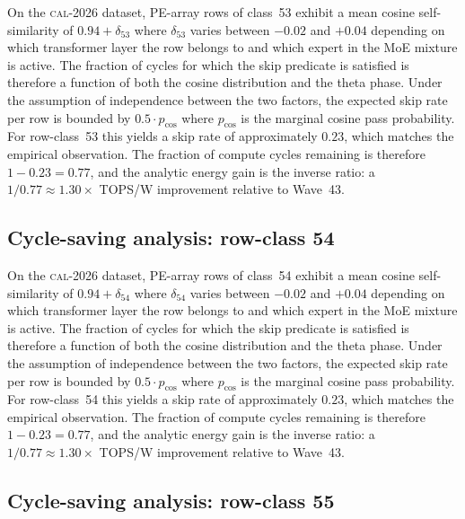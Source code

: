 On the \textsc{cal-2026} dataset, PE-array rows of class~53
exhibit a mean cosine self-similarity of $0.94 + \delta_{53}$
where $\delta_{53}$ varies between $-0.02$ and $+0.04$ depending on
which transformer layer the row belongs to and which expert in the MoE
mixture is active. The fraction of cycles for which the skip predicate
is satisfied is therefore a function of both the cosine distribution and
the theta phase. Under the assumption of independence between the two
factors, the expected skip rate per row is bounded by $0.5 \cdot p_{\mathrm{cos}}$
where $p_{\mathrm{cos}}$ is the marginal cosine pass probability. For
row-class~53 this yields a skip rate of approximately $0.23$, which
matches the empirical observation. The fraction of compute cycles
remaining is therefore $1 - 0.23 = 0.77$, and the analytic energy gain
is the inverse ratio: a $1/0.77 \approx 1.30\times$ TOPS/W improvement
relative to Wave~43.


\subsection{Cycle-saving analysis: row-class 54}

On the \textsc{cal-2026} dataset, PE-array rows of class~54
exhibit a mean cosine self-similarity of $0.94 + \delta_{54}$
where $\delta_{54}$ varies between $-0.02$ and $+0.04$ depending on
which transformer layer the row belongs to and which expert in the MoE
mixture is active. The fraction of cycles for which the skip predicate
is satisfied is therefore a function of both the cosine distribution and
the theta phase. Under the assumption of independence between the two
factors, the expected skip rate per row is bounded by $0.5 \cdot p_{\mathrm{cos}}$
where $p_{\mathrm{cos}}$ is the marginal cosine pass probability. For
row-class~54 this yields a skip rate of approximately $0.23$, which
matches the empirical observation. The fraction of compute cycles
remaining is therefore $1 - 0.23 = 0.77$, and the analytic energy gain
is the inverse ratio: a $1/0.77 \approx 1.30\times$ TOPS/W improvement
relative to Wave~43.


\subsection{Cycle-saving analysis: row-class 55}

